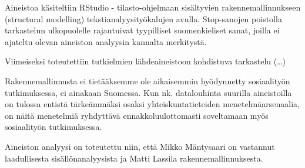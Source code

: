Aineistoa käsiteltiin RStudio - tilasto-ohjelmaan sisältyvien
rakennemallinnukseen (structural modelling) tekstianalyysityökalujen
avulla. Stop-sanojen poistolla tarkastelun ulkopuolelle rajautuivat
tyypilliset suomenkieliset sanat, joilla ei ajateltu olevan aineiston
analyysin kannalta merkitystä.

Viimeiseksi toteutettiin tutkielmien lähdeaineistoon kohdistuva
tarkastelu (\ldots{})

Rakennemallinnusta ei tietääksemme ole aikaisemmin hyödynnetty
sosiaalityön tutkimuksessa, ei ainakaan Suomessa. Kun nk. datalouhinta
suurilla aineistoilla on tulossa entistä tärkeämmäksi osaksi
yhteiskuntatieteiden menetelmäarsenaalia, on näitä menetelmiä ryhdyttävä
ennakkoluulottomasti soveltamaan myös sosiaalityön tutkimuksessa.

Aineiston analyysi on toteutettu niin, että Mikko Mäntysaari on
vastannut laadullisesta sisällönanalyysista ja Matti Lassila
rakennemallinnuksesta.
